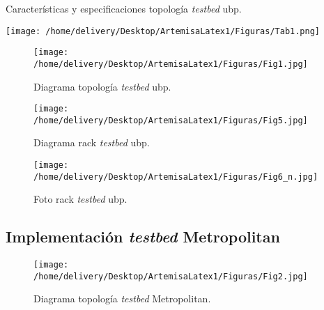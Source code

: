 \documentclass[a4paper,12pt]{report}
\begin{document}
\begin{table}[h!]
\caption{Características y especificaciones topología \emph{testbed} \ac{ubp}.}
\centering
\texttt{[image: /home/delivery/Desktop/ArtemisaLatex1/Figuras/Tab1.png]}
\label{testbed_ubp_tabla}
\end{table}

\begin{figure}[h!] 
\centering
\texttt{[image: /home/delivery/Desktop/ArtemisaLatex1/Figuras/Fig1.jpg]}
\caption{Diagrama topología \emph{testbed} \ac{ubp}.}
\label{testbed_ubp}
\end{figure}

\begin{figure}[h!] 
\centering
\texttt{[image: /home/delivery/Desktop/ArtemisaLatex1/Figuras/Fig5.jpg]}
\caption{Diagrama rack \emph{testbed} \ac{ubp}.}
\label{testbed_ubp_rack}
\end{figure}

\begin{center}
\color{white}{.}
\end{center}
\begin{center}
\color{white}{.}
\end{center}

\begin{figure}[h!] 
\centering
\texttt{[image: /home/delivery/Desktop/ArtemisaLatex1/Figuras/Fig6\_n.jpg]}
\caption{Foto rack \emph{testbed} \ac{ubp}.}
\label{testbed_ubp_rack_foto}
\end{figure}

\clearpage

\subsection{Implementación \emph{testbed} Metropolitan}
\label{imple_testbed_metropolitan}
\begin{center}
\color{white}{.}
\end{center}
\begin{figure}[h!] 
\centering
\texttt{[image: /home/delivery/Desktop/ArtemisaLatex1/Figuras/Fig2.jpg]}
\caption{Diagrama topología \emph{testbed} Metropolitan.}
\label{testbed_metropolitan}
\end{figure}

\newpage
\end{document}

